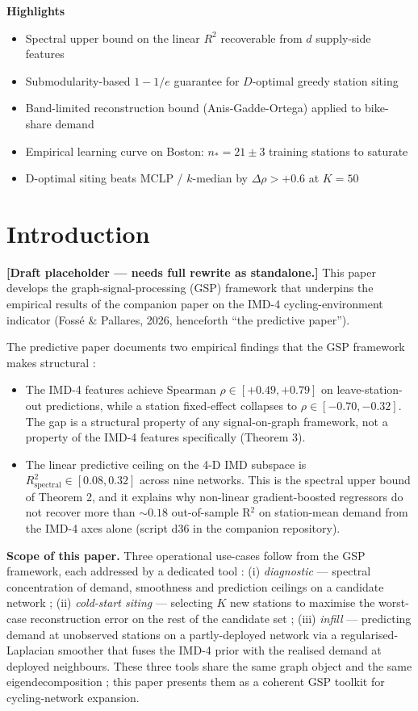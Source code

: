 \documentclass[11pt,a4paper]{article}
\newenvironment{highlights}{%
  \par\noindent\textbf{\large Highlights}\par\smallskip
  \begin{itemize}[leftmargin=1.4em,itemsep=0.15em,topsep=0.2em]}{%
  \end{itemize}\par\medskip}
\begin{document}
\begin{highlights}
\item Spectral upper bound on the linear $R^2$ recoverable from $d$ supply-side features
\item Submodularity-based $1-1/e$ guarantee for $D$-optimal greedy station siting
\item Band-limited reconstruction bound (Anis-Gadde-Ortega) applied to bike-share demand
\item Empirical learning curve on Boston: $n_* = 21 \pm 3$ training stations to saturate
\item D-optimal siting beats MCLP / $k$-median by $\Delta \rho > +0.6$ at $K = 50$
\end{highlights}

\section{Introduction}
\label{sec:intro}

\textbf{[Draft placeholder — needs full rewrite as standalone.]}
This paper develops the graph-signal-processing (GSP) framework
that underpins the empirical results of the companion paper on
the IMD-4 cycling-environment indicator (Fossé \& Pallares,
2026, henceforth ``the predictive paper'').

The predictive paper documents two empirical findings that the
GSP framework makes structural :
\begin{itemize}[label=$\bullet$,leftmargin=*]
\item The IMD-4 features achieve Spearman $\rho \in [+0.49,
      +0.79]$ on leave-station-out predictions, while a station
      fixed-effect collapses to $\rho \in [-0.70, -0.32]$. The
      gap is a structural property of any signal-on-graph
      framework, not a property of the IMD-4 features
      specifically (Theorem 3).
\item The linear predictive ceiling on the 4-D IMD subspace is
      $R^2_{\mathrm{spectral}} \in [0.08, 0.32]$ across nine
      networks.  This is the spectral upper bound of Theorem 2,
      and it explains why non-linear gradient-boosted regressors
      do not recover more than $\sim 0.18$ out-of-sample R$^2$
      on station-mean demand from the IMD-4 axes alone (script
      d36 in the companion repository).
\end{itemize}

\textbf{Scope of this paper.}  Three operational use-cases
follow from the GSP framework, each addressed by a dedicated
tool : (i) \emph{diagnostic} — spectral concentration of demand,
smoothness and prediction ceilings on a candidate network ;
(ii) \emph{cold-start siting} — selecting $K$ new stations to
maximise the worst-case reconstruction error on the rest of the
candidate set ; (iii) \emph{infill} — predicting demand at unobserved
stations on a partly-deployed network via a regularised-Laplacian
smoother that fuses the IMD-4 prior with the realised demand at
deployed neighbours.  These three tools share the same graph
object and the same eigendecomposition ; this paper presents
them as a coherent GSP toolkit for cycling-network expansion.
\end{document}
